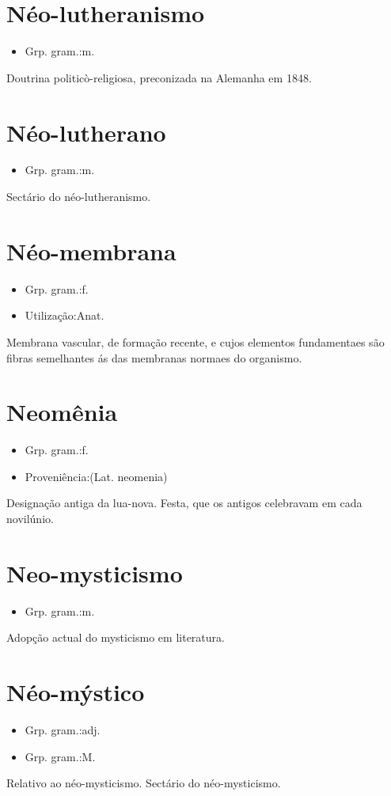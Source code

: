 \section{Néo-lutheranismo}
\begin{itemize}
\item {Grp. gram.:m.}
\end{itemize}
Doutrina politicò-religiosa, preconizada na Alemanha em 1848.
\section{Néo-lutherano}
\begin{itemize}
\item {Grp. gram.:m.}
\end{itemize}
Sectário do néo-lutheranismo.
\section{Néo-membrana}
\begin{itemize}
\item {Grp. gram.:f.}
\end{itemize}
\begin{itemize}
\item {Utilização:Anat.}
\end{itemize}
Membrana vascular, de formação recente, e cujos elementos fundamentaes são fibras semelhantes ás das membranas normaes do organismo.
\section{Neomênia}
\begin{itemize}
\item {Grp. gram.:f.}
\end{itemize}
\begin{itemize}
\item {Proveniência:(Lat. \textunderscore neomenia\textunderscore )}
\end{itemize}
Designação antiga da lua-nova.
Festa, que os antigos celebravam em cada novilúnio.
\section{Neo-mysticismo}
\begin{itemize}
\item {Grp. gram.:m.}
\end{itemize}
Adopção actual do mysticismo em literatura.
\section{Néo-mýstico}
\begin{itemize}
\item {Grp. gram.:adj.}
\end{itemize}
\begin{itemize}
\item {Grp. gram.:M.}
\end{itemize}
Relativo ao néo-mysticismo.
Sectário do néo-mysticismo.
